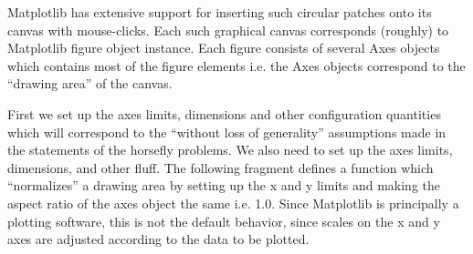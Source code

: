 \documentclass[11.5pt]{report}
\begin{document}
Matplotlib has extensive support for inserting such circular patches onto its canvas with 
mouse-clicks. Each such graphical canvas corresponds (roughly) to Matplotlib figure
object instance. Each figure consists of several Axes objects which contains
most of the figure elements i.e. the Axes objects correspond to the ``drawing area''
of the canvas. 

\newchunk First we set up the axes limits, dimensions and other configuration quantities
which will correspond to the ``without loss of generality'' assumptions made in the 
statements of the horsefly problems. We also need to set up the axes limits,
dimensions, and other fluff. The following fragment defines a function which 
``normalizes'' a drawing area by setting up the x and y limits and making the 
aspect ratio of the axes object the same i.e. 1.0. Since Matplotlib is principally
a plotting software, this is not the default behavior, since scales on the x and y 
axes are adjusted according to the data to be plotted. 
\end{document}
